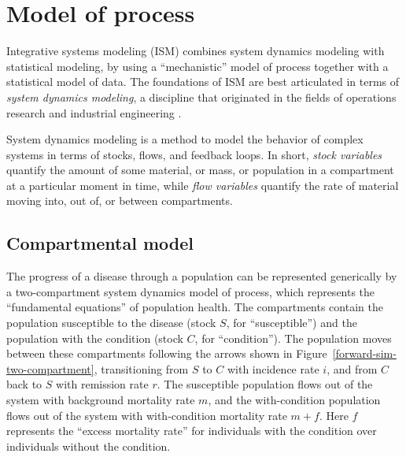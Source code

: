 \documentclass[12pt]{article}
\newcommand{\1}{\mathbf{1}}
\newcommand{\0}{\mathbf{0}}
\begin{document}
\section{Model of process}
\label{process}
Integrative systems modeling (ISM) combines system dynamics modeling
with statistical modeling, by using a ``mechanistic'' model of process
together with a statistical model of data.  The foundations of ISM are
best articulated in terms of \emph{system dynamics modeling}, a
discipline that originated in the fields of operations research and
industrial engineering \cite{Forrester 1961. Industrial
  dynamics. Waltham, MA: Pegasus Communications} \cite{Forrester
  1969. Urban Dynamics. Pegasus Communications} \cite{Forrester
  1971. World Dynamics. Wright-Allen Press} \cite{Forrester
  1971. World Dynamics. Wright-Allen Press}
\cite{Meadows_Thinking_2008}.

System dynamics modeling is a method to model the behavior of complex
systems in terms of stocks, flows, and feedback loops.  In short,
\emph{stock variables} quantify the amount of some material, or mass,
or population in a compartment at a particular moment in time, while
\emph{flow variables} quantify the rate of material moving into, out
of, or between compartments.


\subsection{Compartmental model}
The progress of a disease through a population can be represented
generically by a two-compartment system dynamics model of process,
which represents the ``fundamental equations'' of population
health. The compartments contain the population susceptible to the
disease (stock $S$, for ``susceptible'') and the population with the
condition (stock $C$, for ``condition''). The population moves between
these compartments following the arrows shown in
Figure~\ref{forward-sim-two-compartment}, transitioning from $S$ to
$C$ with incidence rate $i$, and from $C$ back to $S$ with remission
rate $r$. The susceptible population flows out of the system with
background mortality rate $m$, and the with-condition population flows
out of the system with with-condition mortality rate $m+f$.  Here $f$
represents the ``excess mortality rate'' for individuals with the
condition over individuals without the condition.
\end{document}
